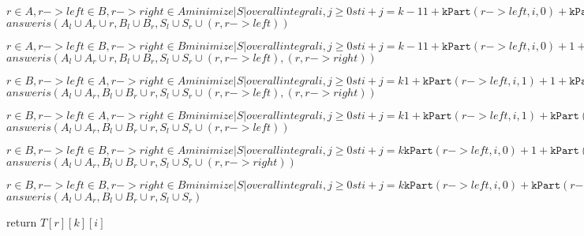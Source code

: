 \documentclass[11pt]{article}
\begin{document}
          $r \in A, r->left \in B, r->right \in A
              minimize |S| over all integral i,j \geq 0 st i+j = k-1
                1 + \mathtt{kPart}(r->left,i,0) +     \mathtt{kPart}(r->right,j,1)$
                $answer is (A_l \cup A_r \cup {r},B_l \cup B_r,S_l \cup S_r \cup {(r, r->left)})$

          $r \in A, r->left \in B, r->right \in B
              minimize |S| over all integral i,j \geq 0 st i+j = k-1
                1 + \mathtt{kPart}(r->left,i,0) + 1 + \mathtt{kPart}(r->right,j,0)$
                $answer is (A_l \cup A_r \cup {r},B_l \cup B_r,S_l \cup S_r \cup {(r, r->left),(r, r->right)})$

          $r \in B, r->left \in A, r->right \in A
              minimize |S| over all integral i,j \geq 0 st i+j = k
                1 + \mathtt{kPart}(r->left,i,1) + 1 + \mathtt{kPart}(r->right,j,1)$
                $answer is (A_l \cup A_r,B_l \cup B_r \cup {r},S_l \cup S_r \cup {(r, r->left),(r, r->right)})$

          $r \in B, r->left \in A, r->right \in B
              minimize |S| over all integral i,j \geq 0 st i+j = k
                1 + \mathtt{kPart}(r->left,i,1) +     \mathtt{kPart}(r->right,j,0)$
                $answer is (A_l \cup A_r,B_l \cup B_r \cup {r},S_l \cup S_r \cup {(r, r->left)})$

          $r \in B, r->left \in B, r->right \in A
              minimize |S| over all integral i,j \geq 0 st i+j = k
                    \mathtt{kPart}(r->left,i,0) + 1 + \mathtt{kPart}(r->right,j,1)$
                $answer is (A_l \cup A_r,B_l \cup B_r \cup {r},S_l \cup S_r \cup {(r, r->right)})$

          $r \in B, r->left \in B, r->right \in B
              minimize |S| over all integral i,j \geq 0 st i+j = k
                    \mathtt{kPart}(r->left,i,0) +     \mathtt{kPart}(r->right,j,0)$
                $answer is (A_l \cup A_r,B_l \cup B_r \cup {r},S_l \cup S_r)$


   return $T[r][k][i]$
\end{document}
